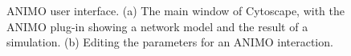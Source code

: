 \documentclass[submission,copyright,creativecommons]{eptcs}
\begin{document}
\begin{figure}[htbp]
\begin{center}
 \quad
{}
\caption{ANIMO user interface. (a) The main window of Cytoscape, with the ANIMO
plug-in showing a network model and the result of a simulation. (b) Editing the parameters for an ANIMO interaction.}
\end{center}
\end{figure}

\end{document}
